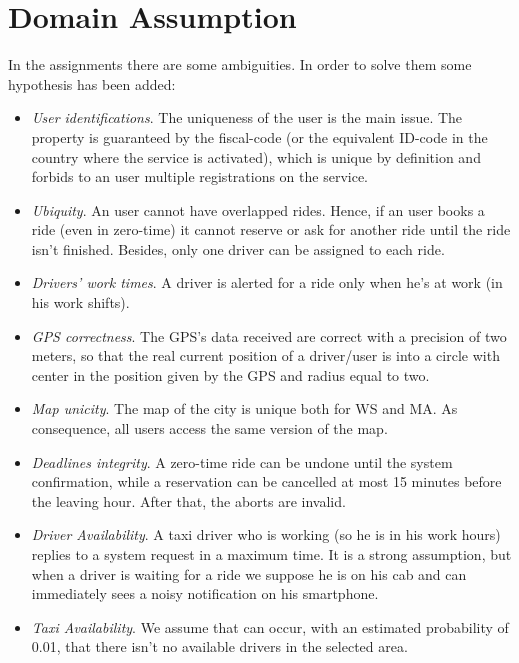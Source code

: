 \section{Domain Assumption}
In the assignments there are some ambiguities. In order to solve them some hypothesis has been added:
\begin{itemize}
	\item \textit{User identifications}. The uniqueness of the user is the main issue. The property is guaranteed by the fiscal-code (or the equivalent ID-code in the country where the service is activated), which is unique by definition and forbids to an user multiple registrations on the service.
	\item \textit{Ubiquity}. An user cannot have overlapped rides. Hence, if an user books a ride (even in zero-time) it cannot reserve or ask for another ride until the ride isn't finished.
Besides, only one driver can be assigned to each ride.
	\item \textit{Drivers' work times}. A driver is alerted for a ride only when he's at work (in his work shifts).
	\item \textit{GPS correctness}. The GPS's data received are correct with a precision of two meters, so that the real current position of a driver/user is into a circle with center in the position given by the GPS and radius equal to two.
	\item \textit{Map unicity}. The map of the city is unique both for WS and MA. As consequence, all users access the same version of the map.
	\item \textit{Deadlines integrity}. A zero-time ride can be undone until the system confirmation, while a reservation can be cancelled at most 15 minutes before the leaving hour. After that, the aborts are invalid.
	\item \textit{Driver Availability}. A taxi driver who is working (so he is in his work hours) replies to a system request in a maximum time. It is a strong assumption, but when a driver is waiting for a ride we suppose he is on his cab and can immediately sees a noisy notification on his smartphone.
	\item \textit{Taxi Availability}. We assume that can occur, with an estimated probability of 0.01, that there isn't no available drivers in the selected area. 
\end{itemize}

